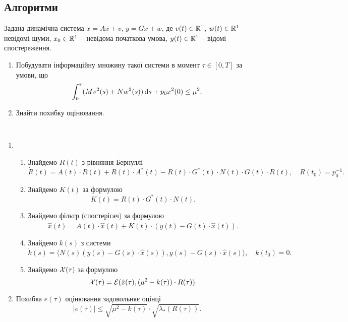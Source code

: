 \subsection{Алгоритми}

\begin{problem*}
	Задана динамічна система $\dot x = A x + v$, $y = G x + w$, де $v(t) \in \mathbb{R}^1$, $w(t) \in \mathbb{R}^1$ -- невідомі шуми, $x_0 \in \mathbb{R}^1$ -- невідома початкова умова, $y(t) \in \mathbb{R}^1$ -- відомі спостереження. 

	\begin{enumerate}
		\item Побудувати інформаційну множину такої системи в момент $\tau \in [0, T]$ за умови, що \[ \int_0^\tau (Mv^2(s) + Nw^2(s)) \mathop{}\!\mathrm{d} s + p_0x^2(0) \le \mu^2. \]
		\item Знайти похибку оцінювання.
	\end{enumerate}
\end{problem*}

\begin{algorithm} \tt
	\begin{enumerate}
		\item \begin{enumerate}
			\item Знайдемо $R(t)$ з рівняння Бернуллі \[\dot R (t)= A (t) \cdot R (t)+ R (t) \cdot A^* (t)- R (t) \cdot G^* (t) \cdot N (t) \cdot G (t) \cdot R(t), \quad R(t_0) = p_0^{-1}. \]
			\item Знайдемо $K(t)$ за формулою \[K (t)= R (t) \cdot G^* (t) \cdot N(t).\]
			\item Знайдемо фільтр (спостерігач) за формулою \[ \dot{\hat{x}} (t) = A (t) \cdot \hat x (t) + K (t) \cdot (y (t) - G (t) \cdot \hat x (t)). \]
			\item Знайдемо $k(s)$ з системи \[ \dot k (s) = \langle N(s) (y(s) - G(s) \cdot \hat x(s)), y(s) - G(s) \cdot \hat x(s)\rangle, \quad k(t_0) = 0. \]
			\item Знайдемо $\mathcal{X}(\tau)$ за формулою \[ \mathcal{X}(\tau) = \mathcal{E} (\hat x(\tau), (\mu^2 - k(\tau)) \cdot R(\tau)). \]
		\end{enumerate}
		\item Похибка $e(\tau)$ оцінювання задовольняє оцінці \[ |e(\tau)| \le \sqrt{\mu^2-k(\tau)} \cdot \sqrt{\lambda_* (R(\tau))}.\]
	\end{enumerate}
\end{algorithm}
